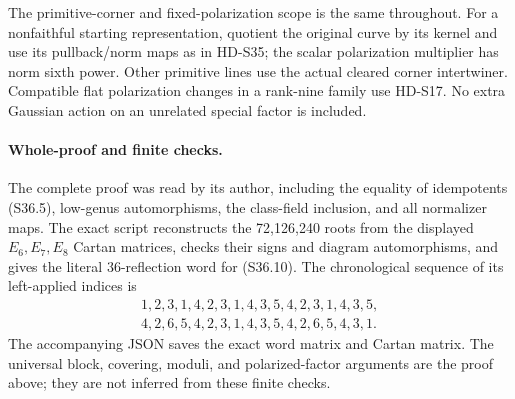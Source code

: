 The primitive-corner and fixed-polarization scope is the same throughout.
For a nonfaithful starting representation, quotient the original curve
by its kernel and use its pullback/norm maps as in HD-S35; the scalar
polarization multiplier has norm sixth power. Other primitive lines
use the actual cleared corner intertwiner. Compatible flat
polarization changes in a rank-nine family use HD-S17. No extra
Gaussian action on an unrelated special factor is included.

\paragraph{Whole-proof and finite checks.}
The complete proof was read by its author, including the equality of
idempotents (S36.5), low-genus automorphisms, the class-field inclusion,
and all normalizer maps. The exact script
 reconstructs the
72,126,240 roots from the displayed \(E_6,E_7,E_8\) Cartan matrices,
checks their signs and diagram automorphisms, and gives the literal
36-reflection word for (S36.10). The chronological sequence of its
left-applied indices is
\[
\begin{gathered}
1,2,3,1,4,2,3,1,4,3,5,4,2,3,1,4,3,5,\\
4,2,6,5,4,2,3,1,4,3,5,4,2,6,5,4,3,1.
\end{gathered}
\]
The accompanying JSON saves the exact word matrix and Cartan matrix.
The universal block, covering, moduli, and polarized-factor arguments
are the proof above; they are not inferred from these finite checks.
